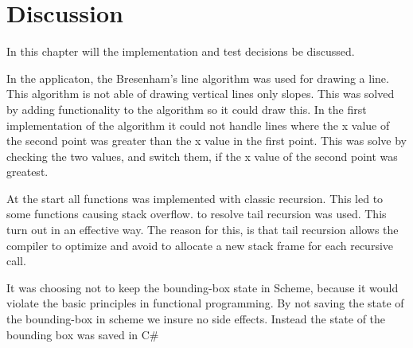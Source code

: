 \chapter{Discussion}
\label{chp:disc}

In this chapter will the implementation and test decisions be discussed. 

In the applicaton, the Bresenham’s line algorithm was used for drawing a line. This algorithm is not able of drawing vertical lines only slopes. This was solved by adding functionality to the algorithm so it could draw this. In the first implementation of the algorithm it could not handle lines where the x value of the second point was greater than the x value in the first point. This was solve by checking the two values, and switch them, if the x value of the second point was greatest.


At the start all functions was implemented with classic recursion. This led to some functions causing stack overflow. to resolve tail recursion was used. This turn out in an effective way. The reason for this, is that tail recursion allows the compiler to optimize and avoid to allocate a new stack frame for each recursive call. 

It was choosing not to keep the bounding-box state in Scheme, because it would violate the basic principles in functional programming. By not saving the state of the bounding-box in scheme we insure no side effects. Instead the state of the bounding box was saved in C\# 